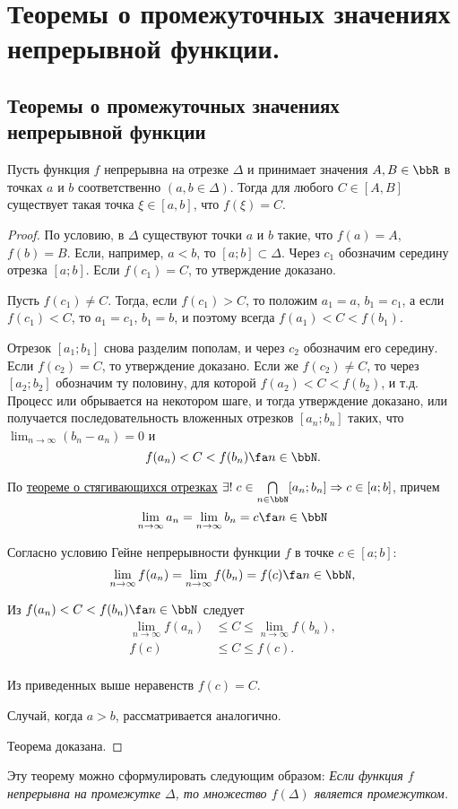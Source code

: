 \chapter{Теоремы о промежуточных значениях непрерывной функции.}
\section{Теоремы о промежуточных значениях непрерывной функции}

\begin{thm}  \label{ch3n2}
Пусть функция $f$ непрерывна на отрезке $\Delta$ и принимает значения $A,B \in \bbR$ в точках $a$ и $b$ соответственно $(a,b \in \Delta )$. Тогда для любого $C\in[A,B]$ существует такая точка $\xi \in [a,b]$, что $f(\xi)=C$.
\end{thm}
\begin{proof}
По условию, в $\Delta$ существуют точки $a$ и $b$ такие, что $f(a) = A$, $f(b) = B$. Если, например, $a < b$, то $[a; b] \subset \Delta$.
Через $c_1$ обозначим середину отрезка $[a;b]$. Если $f(c_1) = C$, то утверждение доказано.

Пусть $f(c_1)\ne C$. Тогда, если $f(c_1) > C$, то положим $a_1 = a$, $b_1 = c_1$, а если $f(c_1) < C$, то $a_1 = c_1$, $b_1 = b$, и поэтому всегда $f(a_1)<C<f(b_1)$.

Отрезок $[a_1; b_1]$ снова разделим пополам, и через $c_2$ обозначим его середину. Если $f(c_2) = C$, то утверждение доказано. Если же $f(c_2) \ne C$, то через $[a_2;b_2]$ обозначим ту половину, для которой $f(a_2) < C < f(b_2)$, и т.д. Процесс или обрывается на некотором шаге, и тогда утверждение доказано, или получается последовательность вложенных отрезков $[a_n;b_n]$ таких, что $\lim_{n \to \infty}\limits(b_n-a_n)=0$ и
$$
f(a_n)<C<f(b_n) \fa n\in \bbN.
$$

По \hyperref[exp3]{теореме о стягивающихся отрезках} $\exists!\; c \in \bigcap_{n \in \bbN}\limits[a_n;b_n] \Rightarrow c\in [a;b]$, причем 
$$
\lim_{n \to \infty}a_n = \lim_{n \to \infty}b_n = c \fa n \in \bbN
$$

Согласно условию Гейне непрерывности функции $f$ в точке $c\in[a;b]$:
$$
\lim_{n \to \infty}f(a_n) = \lim_{n \to \infty}f(b_n) = f(c) \fa n \in \bbN,
$$

Из $f(a_n)<C<f(b_n) \fa n\in\bbN$ следует 
\begin{equation*}
\begin{split}
\lim_{n \to \infty}f(a_n) &\le C \le \lim_{n \to \infty}f(b_n),\\
f(c)&\le C\le f(c).\\
\end{split}
\end{equation*}

Из приведенных выше неравенств $f(c)=C$.

Случай, когда $a > b$, рассматривается аналогично. 

\noindent 
Теорема доказана.
\end{proof}
Эту теорему можно сформулировать следующим образом:	\textit{Если функция
$f$ непрерывна на промежутке $\Delta$, то множество $f(\Delta)$ является промежутком.}

